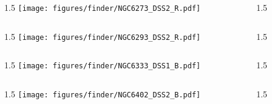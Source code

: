 \documentclass[final]{beamer}
\newlength{\colwidth}
\begin{document}

\begin{frame}[t]{}
  \begin{columns}[T]
    \begin{column}{1.5\colwidth}
      \centering
      \texttt{[image: figures/finder/NGC6273\_DSS2\_R.pdf]}
    \end{column}
    \begin{column}{1.5\colwidth}
      \Large
      
    \end{column}
  \end{columns}
  \vspace{\fill}
  \begin{columns}[T]
    \begin{column}{1.5\colwidth}
      \centering
      \texttt{[image: figures/finder/NGC6293\_DSS2\_R.pdf]}
    \end{column}
    \begin{column}{1.5\colwidth}
      \Large
      
    \end{column}
  \end{columns}
\end{frame}


\begin{frame}[t]{}
  \begin{columns}[T]
    \begin{column}{1.5\colwidth}
      \centering
      \texttt{[image: figures/finder/NGC6333\_DSS1\_B.pdf]}
    \end{column}
    \begin{column}{1.5\colwidth}
      \Large
      
    \end{column}
  \end{columns}
  \vspace{\fill}
  \begin{columns}[T]
    \begin{column}{1.5\colwidth}
      \centering
      \texttt{[image: figures/finder/NGC6402\_DSS2\_B.pdf]}
    \end{column}
    \begin{column}{1.5\colwidth}
      \Large
      
    \end{column}
  \end{columns}
\end{frame}
\end{document}
